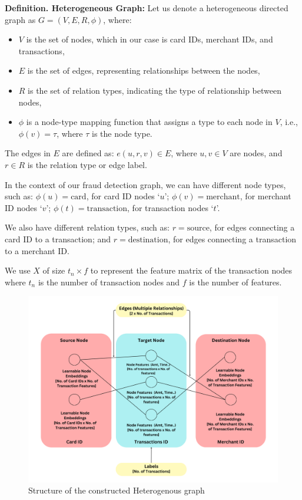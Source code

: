 \documentclass[pdflatex,sn-mathphys-num]{sn-jnl}%
\begin{document}
\textbf{Definition. Heterogeneous Graph:} Let us denote a heterogeneous directed graph as $G = (V, E, R, \phi)$, where:
\begin{itemize}
    \item $V$ is the set of nodes, which in our case is card IDs, merchant IDs, and transactions,
    \item $E$ is the set of edges, representing relationships between the nodes,
    \item $R$ is the set of relation types, indicating the type of relationship between nodes,
    \item $\phi$ is a node-type mapping function that assigns a type to each node in $V$, i.e., $\phi(v) = \tau$, where $\tau$ is the node type.
\end{itemize}

The edges in $E$ are defined as: $e(u, r, v) \in E$, where $u, v \in V$ are nodes, and $r \in R$ is the relation type or edge label.

In the context of our fraud detection graph, we can have different node types, such as: $\phi(u) = \text{card}$, for card ID nodes `$u$'; $\phi(v) = \text{merchant}$, for merchant ID nodes `$v$'; $\phi(t) = \text{transaction}$, for transaction nodes `$t$'. 

We also have different relation types, such as: $r = \text{source}$, for edges connecting a card ID to a transaction; and $r = \text{destination}$, for edges connecting a transaction to a merchant ID.

We use $X$ of size $t_n \times f$ to represent the feature matrix of the transaction nodes where $t_n$ is the number of transaction nodes and $f$ is the number of features.

\begin{figure}[h]
\centering
\includegraphics[width=1.0\textwidth]{graph_architecture.png}
\caption{Structure of the constructed Heterogenous graph}\label{fig1}
\end{figure}
\end{document}
